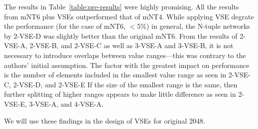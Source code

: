 
The results in Table~\ref{table:pre-results} were highly promising.
All the results from \textsf{mNT6} plus VSEs outperformed that of \textsf{mNT4}.
While applying VSE degrate the performance (for the case of mNT6, $<$5\%) in general, the N-tuple networks by 2-VSE-D was slightly better than the original mNT6.
From the results of 2-VSE-A, 2-VSE-B, and 2-VSE-C as well as 3-VSE-A and 3-VSE-B, it is not necessary to introduce overlaps between value ranges---this was contrary to the authors' initial assumption.
The factor with the greatest impact on performance is the number of elements included in the smallest value range as seen in 2-VSE-C, 2-VSE-D, and 2-VSE-E
If the size of the smallest range is the same, then further splitting of higher ranges appears to make little difference as seen in 2-VSE-E, 3-VSE-A, and 4-VSE-A.

We will use these findings in the design of VSEs for original 2048.
